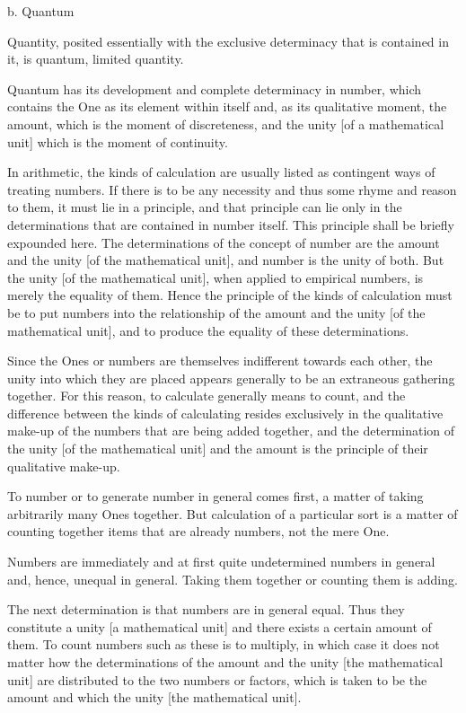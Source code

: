 b. Quantum

Quantity, posited essentially with the exclusive determinacy
that is contained in it, is quantum, limited quantity.

Quantum has its development and complete determinacy in number,
which contains the One as its element within itself
and, as its qualitative moment, the amount,
which is the moment of discreteness,
and the unity [of a mathematical unit]
which is the moment of continuity.

    In arithmetic, the kinds of calculation are
    usually listed as contingent ways of treating numbers.
    If there is to be any necessity
    and thus some rhyme and reason to them,
    it must lie in a principle,
    and that principle can lie only
    in the determinations that are
    contained in number itself.
    This principle shall be briefly expounded here.
    The determinations of the concept of number are
    the amount and the unity [of the mathematical unit],
    and number is the unity of both.
    But the unity [of the mathematical unit],
    when applied to empirical numbers,
    is merely the equality of them.
    Hence the principle of the kinds of calculation must be
    to put numbers into the relationship of
    the amount and the unity [of the mathematical unit],
    and to produce the equality of these determinations.

    Since the Ones or numbers are themselves indifferent towards
    each other, the unity into which they are placed appears generally
    to be an extraneous gathering together.
    For this reason, to calculate generally means to count,
    and the difference between the kinds of calculating
    resides exclusively in the qualitative make-up of
    the numbers that are being added together,
    and the determination of the unity [of the mathematical unit]
    and the amount is the principle of their qualitative make-up.

    To number or to generate number in general comes first,
    a matter of taking arbitrarily many Ones together.
    But calculation of a particular sort is a matter of
    counting together items that are already numbers,
    not the mere One.

    Numbers are immediately and at first
    quite undetermined numbers in general
    and, hence, unequal in general.
    Taking them together or counting them is adding.

    The next determination is that
    numbers are in general equal.
    Thus they constitute a unity [a mathematical unit]
    and there exists a certain amount of them.
    To count numbers such as these is to multiply,
    in which case it does not matter how the determinations
    of the amount and the unity [the mathematical unit] are distributed
    to the two numbers or factors,
    which is taken to be the amount
    and which the unity [the mathematical unit].


